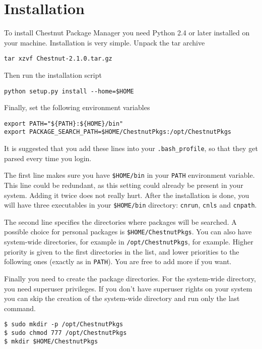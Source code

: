 \section{Installation}
To install Chestnut Package Manager you need Python 2.4 or later installed on
your machine. Installation is very simple. Unpack the tar archive

\begin{verbatim}
tar xzvf Chestnut-2.1.0.tar.gz
\end{verbatim}

Then run the installation script

\begin{verbatim}
python setup.py install --home=$HOME
\end{verbatim}

Finally, set the following environment variables

\begin{verbatim}
export PATH="${PATH}:${HOME}/bin"
export PACKAGE_SEARCH_PATH=$HOME/ChestnutPkgs:/opt/ChestnutPkgs
\end{verbatim}

It is suggested that you add these lines into your \verb+.bash_profile+, so that they
get parsed every time you login.

The first line makes sure you have \verb+$HOME/bin+ in your \verb+PATH+ environment
variable. This line could be redundant, as this setting could already be
present in your system. Adding it twice does not really hurt.  After the
installation is done, you will have three executables in your \verb+$HOME/bin+
directory: \verb+cnrun+, \verb+cnls+ and \verb+cnpath+.

The second line specifies the directories where packages will be searched. A
possible choice for personal packages is \verb+$HOME/ChestnutPkgs+. You
can also have system-wide directories, for example in \verb+/opt/ChestnutPkgs+,
for example. Higher priority is given to the first directories in the list, and
lower priorities to the following ones (exactly as in \verb+PATH+). You are free to
add more if you want.

Finally you need to create the package directories. For the system-wide
directory, you need superuser privileges.  If you don't have superuser rights
on your system you can skip the creation of the system-wide directory and run
only the last command.

\begin{verbatim}
$ sudo mkdir -p /opt/ChestnutPkgs
$ sudo chmod 777 /opt/ChestnutPkgs
$ mkdir $HOME/ChestnutPkgs
\end{verbatim}


